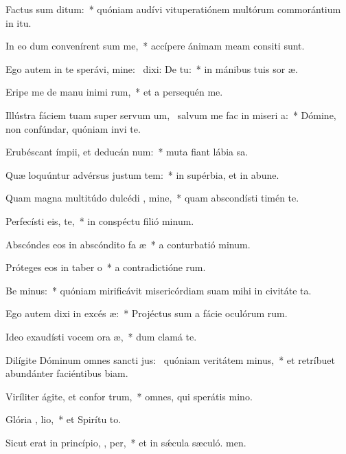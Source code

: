 \item Factus sum   ditum:~* quóniam audívi vituperatiónem multórum commorántium in itu.
\item In eo dum convenírent  sum me,~* accípere ánimam meam consiti sunt.
\item Ego autem in te sperávi, mine:~\pscross{} dixi: De   tu:~* in mánibus tuis sor æ.
\item Eripe me de manu inimi rum,~* et a persequén me.
\item Illústra fáciem tuam super servum um,~\pscross{} salvum me fac in miseri a:~* Dómine, non confúndar, quóniam invi te.
\item Erubéscant ímpii, et deducán  num:~* muta fiant lábia sa.
\item Quæ loquúntur advérsus justum tem:~* in supérbia, et in abune.
\item Quam magna multitúdo dulcédi , mine,~* quam abscondísti timén te.
\item Perfecísti eis,    te,~* in conspéctu filió minum.
\item Abscóndes eos in abscóndito fa æ~* a conturbatió minum.
\item Próteges eos in taber o~* a contradictióne rum.
\item Be minus:~* quóniam mirificávit misericórdiam suam mihi in civitáte ta.
\item Ego autem dixi in excés  æ:~* Projéctus sum a fácie oculórum rum.
\item Ideo exaudísti vocem ora æ,~* dum clamá  te.
\item Dilígite Dóminum omnes sancti jus:~\pscross{} quóniam veritátem  minus,~* et retríbuet abundánter faciéntibus biam.
\item Viríliter ágite, et confor  trum,~* omnes, qui sperátis  mino.
\item Glória ,  lio,~* et Spirítu to.
\item Sicut erat in princípio,  ,  per,~* et in sǽcula sæculó. men.
